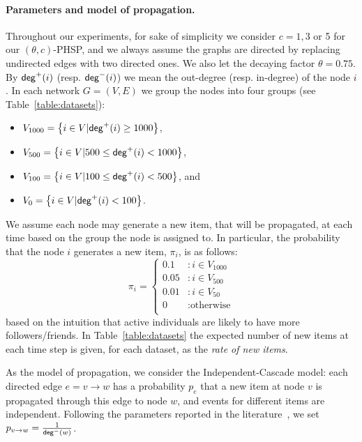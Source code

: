 \paragraph{\bf Parameters and model of propagation.}
Throughout our experiments, for sake of simplicity we consider $c=1,3$ or 5 for our $(\theta,c)$-PHSP, and we always assume the graphs are directed by replacing undirected edges with two directed ones. We also let the decaying factor $\theta = 0.75$. By $\mathsf{deg}^+(i)$ (resp. $\mathsf{deg}^-(i)$) we mean the out-degree (resp. in-degree) of the node $i$. In each network $G=(V,E)$ we group the nodes into four groups (see Table~\ref{table:datasets}):
\begin{itemize}
 \item $V_{1000} = \left\{i\in V \vert \mathsf{deg}^+(i) \geq 1000\right\}$,
 \item $V_{500}  = \left\{i\in V \vert 500\leq \mathsf{deg}^+(i) < 1000\right\}$,
 \item $V_{100}  = \left\{i\in V \vert 100\leq \mathsf{deg}^+(i) < 500\right\}$, and
 \item $V_{0}    = \left\{i\in V \vert \mathsf{deg}^+(i) < 100\right\}$.
\end{itemize}
We assume each node may generate a new item, that will be propagated, at each time based on the group the node is assigned to. In particular, the probability that the node $i$ generates a new item, $\pi_i$, is as follows:
$$
   \pi_i = \left\{
     \begin{array}{ll}
       0.1 &: i \in V_{1000}\\
       0.05 &: i \in V_{500} \\       
       0.01 &: i \in V_{50} \\
       0 & : \text{otherwise} \\
     \end{array}
   \right.
$$
based on the intuition that active individuals are  likely to have more followers/friends. In Table~\ref{table:datasets} the expected number of new items at each time step is given, for each dataset, as the \emph{rate of new items}.




As the model of propagation, we consider the Independent-Cascade model\cite{Kempe2003}:  each directed edge $e=v\rightarrow w$ has a probability $p_e$ that a new item at node $v$ is propagated through this edge to node $w$, and events for different items are independent. Following the parameters reported in the literature~\cite{Kempe2003,Chen2009,Chen2010,jung2011irie,tang2014influence}, we set $p_{v\rightarrow w} = \frac{1}{\mathsf{deg}^-(w)}$.



